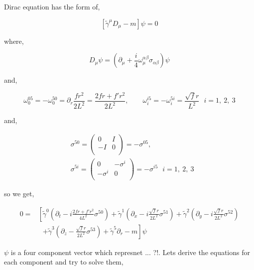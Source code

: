 Dirac equation has the form of,

\begin{equation}
   \left[\tilde{\gamma}^{\mu}D_{\mu} - m\right]\psi = 0
\end{equation}

where,

\begin{equation}
   D_{\mu} \psi = \left(\partial_{\mu} + \frac{i}{4}\omega^{\alpha\beta}_{\mu}\sigma_{\alpha\beta}\right) \psi
\end{equation}

and,

\begin{equation}
   \omega^{05}_{0} = -\omega^{50}_{0} = \partial_r \frac{fr^2}{2L^2} = \frac{2fr+f'r^2}{2L^2}, \qquad 
   \omega^{i5}_{i} = -\omega^{5i}_{i} = \frac{\sqrt{f}r}{L^2} ~~~ i=1,~2,~3
\end{equation}

and,

\begin{align}
   &\sigma^{50} = \begin{pmatrix} 0 & I \\ -I & 0 \\ \end{pmatrix} = -\sigma^{05}, \quad \nonumber\\
   &\sigma^{5i} = \begin{pmatrix} 0 & -\sigma^i \\ -\sigma^i & 0 \\ \end{pmatrix}= -\sigma^{i5} ~~~ i=1,~2,~3 
\end{align}

so we get,

\begin{align}
   0 =& \left[ \tilde{\gamma}^0 \left(\partial_t - i\frac{2fr+f'r^2}{4L^2}\sigma^{50} \right) + \tilde{\gamma}^1 \left(\partial_x - i\frac{\sqrt{f}r}{2L^2}\sigma^{51} \right) + \tilde{\gamma}^2 \left(\partial_y - i\frac{\sqrt{f}r}{2L^2}\sigma^{52} \right) \right. \nonumber\\
      & ~~~  \left. + \tilde{\gamma}^3 \left(\partial_z - \frac{\sqrt{f}r}{2L^2}\sigma^{53} \right) + \tilde{\gamma}^5 \partial_r - m\right] \psi
\end{align}

$\psi$ is a four component vector which represnet ... ?!. Lets derive the equations for each component and try to solve them, 

